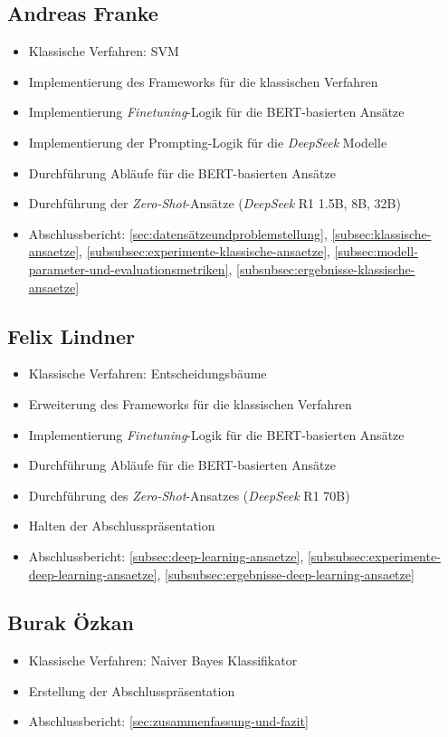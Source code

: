 \begin{multicols}{2}
\subsection{Andreas Franke}
\begin{itemize}
    \item Klassische Verfahren: SVM
    \item Implementierung des Frameworks für die klassischen Verfahren
    \item Implementierung \textit{Finetuning}-Logik für die BERT-basierten Ansätze
    \item Implementierung der Prompting-Logik für die \textit{DeepSeek} Modelle
    \item Durchführung Abläufe für die BERT-basierten Ansätze
    \item Durchführung der \textit{Zero-Shot}-Ansätze (\textit{DeepSeek} R1 1.5B, 8B, 32B)
    \item Abschlussbericht: \ref{sec:datensätzeundproblemstellung}, \ref{subsec:klassische-ansaetze}, \ref{subsubsec:experimente-klassische-ansaetze}, \ref{subsec:modell-parameter-und-evaluationsmetriken}, \ref{subsubsec:ergebnisse-klassische-ansaetze}
\end{itemize}

\subsection{Felix Lindner}
\begin{itemize}
    \item Klassische Verfahren: Entscheidungsbäume
    \item Erweiterung des Frameworks für die klassischen Verfahren
    \item Implementierung \textit{Finetuning}-Logik für die BERT-basierten Ansätze
    \item Durchführung Abläufe für die BERT-basierten Ansätze
    \item Durchführung des \textit{Zero-Shot}-Ansatzes (\textit{DeepSeek} R1 70B)
    \item Halten der Abschlusspräsentation
    \item Abschlussbericht: \ref{subsec:deep-learning-ansaetze}, \ref{subsubsec:experimente-deep-learning-ansaetze}, \ref{subsubsec:ergebnisse-deep-learning-ansaetze} 
\end{itemize}

\subsection{Burak Özkan}
\begin{itemize}
    \item Klassische Verfahren: Naiver Bayes Klassifikator
    \item Erstellung der Abschlusspräsentation
    \item Abschlussbericht: \ref{sec:zusammenfassung-und-fazit} 
\end{itemize}


\end{multicols}
